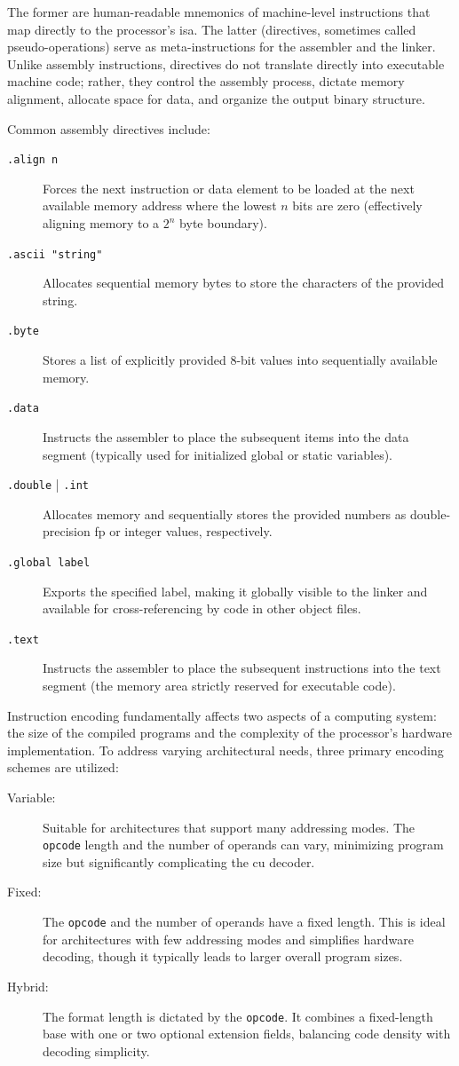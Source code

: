 The former are human-readable mnemonics of machine-level instructions that map directly to the processor's \gls{isa}. The latter (directives, sometimes called pseudo-operations) serve as meta-instructions for the assembler and the linker. Unlike assembly instructions, directives do not translate directly into executable machine code; rather, they control the assembly process, dictate memory alignment, allocate space for data, and organize the output binary structure.

\noindent Common assembly directives include:
\begin{description}
    \item[\texttt{.align n}] Forces the next instruction or data element to be loaded at the next available memory address where the lowest \(n\) bits are zero (effectively aligning memory to a \(2^n\) byte boundary).
    \item[\texttt{.ascii "string"}] Allocates sequential memory bytes to store the characters of the provided string.
    \item[\texttt{.byte}] Stores a list of explicitly provided 8-bit values into sequentially available memory.
    \item[\texttt{.data}] Instructs the assembler to place the subsequent items into the data segment (typically used for initialized global or static variables).
    \item[\texttt{.double} | \texttt{.int}] Allocates memory and sequentially stores the provided numbers as double-precision \gls{fp} or integer values, respectively.
    \item[\texttt{.global label}] Exports the specified label, making it globally visible to the linker and available for cross-referencing by code in other object files.
    \item[\texttt{.text}] Instructs the assembler to place the subsequent instructions into the text segment (the memory area strictly reserved for executable code).
\end{description}

Instruction encoding fundamentally affects two aspects of a computing system: the size of the compiled programs and the complexity of the processor's hardware implementation. To address varying architectural needs, three primary encoding schemes are utilized:
\begin{description}
    \item[Variable:] Suitable for architectures that support many addressing modes. The \texttt{opcode} length and the number of operands can vary, minimizing program size but significantly complicating the \gls{cu} decoder.
    \item[Fixed:] The \texttt{opcode} and the number of operands have a fixed length. This is ideal for architectures with few addressing modes and simplifies hardware decoding, though it typically leads to larger overall program sizes.
    \item[Hybrid:] The format length is dictated by the \texttt{opcode}. It combines a fixed-length base with one or two optional extension fields, balancing code density with decoding simplicity.
\end{description}

